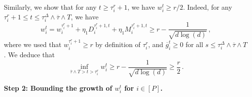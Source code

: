 \documentclass[11pt]{article}
\newcommand{\<}{\langle}
\renewcommand{\>}{\rangle}
\theoremstyle{definition}
\def\og{\overline{g}}
\def\otau{\overline{\tau}}
\begin{document}
Similarly, we show that for any $t \geq \tau^r_i + 1$, we have $w_i^t \geq r/2$. Indeed, for any $\tau^r_i + 1 \leq t \leq \tau_i^\Delta \wedge \otau \wedge T$, we have
\[
w_i^t = w_i^{\tau_i^r +1 } + \eta_1 D_i^{\tau_i^r +1 , t} + \eta_1 M_i^{\tau_i^r+1, t} \geq r - \frac{1}{\sqrt{d \log(d)}}\, , 
\]
where we used that $w_i^{\tau_i^r +1 } \geq r$ by definition of $\tau_i^r$, and $\og_i^t \geq 0 $ for all $s \leq \tau_i^\Delta \wedge \otau \wedge T$. We deduce that
\begin{equation}\label{eq:lb_w_aafter_r}
    \inf_{\otau \wedge T >t > \tau_i^r} w_i^t \geq r - \frac{1}{\sqrt{d\log(d)}} \geq \frac{r}{2} \, .
\end{equation}





\noindent
\textbf{Step 2: Bounding the growth of $w_i^t$ for $i \in [P]$.}
\end{document}
